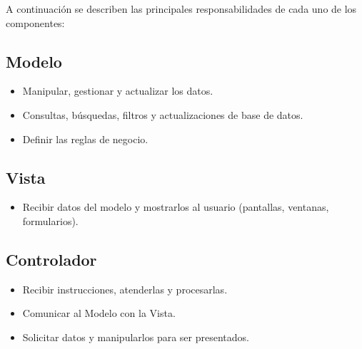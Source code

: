 \newpage
A continuación se describen las principales responsabilidades de cada uno de los componentes: 

\subsection{Modelo}
\begin{itemize}
	\item Manipular, gestionar y actualizar los datos\cite{mvc2}.
	
	\item Consultas, búsquedas, filtros y actualizaciones de base de datos\cite{mvc2}.
	
	\item Definir las reglas de negocio\cite{mvc2}.
	
\end{itemize}

\subsection{Vista}
\begin{itemize}
	\item Recibir datos del modelo y mostrarlos al usuario (pantallas, ventanas, formularios)\cite{mvc2}.
	
\end{itemize}

\subsection{Controlador}
\begin{itemize}
	\item Recibir instrucciones, atenderlas y procesarlas\cite{mvc2}.
	
	\item Comunicar al Modelo con la Vista\cite{mvc2}.
	
	\item Solicitar datos y manipularlos para ser presentados\cite{mvc2}.
\end{itemize}

